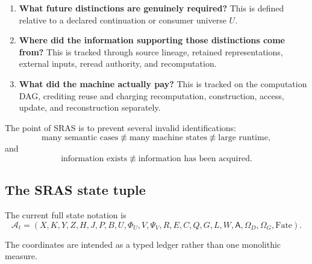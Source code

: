 \documentclass[11pt]{article}
\theoremstyle{plain}
\theoremstyle{definition}
\theoremstyle{remark}
\begin{document}
\begin{enumerate}[leftmargin=1.6em]
\item \textbf{What future distinctions are genuinely required?}
This is defined relative to a declared continuation or consumer universe $U$.

\item \textbf{Where did the information supporting those distinctions come from?}
This is tracked through source lineage, retained representations, external
inputs, reread authority, and recomputation.

\item \textbf{What did the machine actually pay?}
This is tracked on the computation DAG, crediting reuse and charging
recomputation, construction, access, update, and reconstruction separately.
\end{enumerate}

The point of SRAS is to prevent several invalid identifications:
\[
\text{many semantic cases}
\not\equiv
\text{many machine states}
\not\equiv
\text{large runtime},
\]
and
\[
\text{information exists}
\not\equiv
\text{information has been acquired}.
\]

\subsection{The SRAS state tuple}

The current full state notation is
\[
\mathcal A_t=
(X,K,Y,Z,H,J,P,B,U,\Phi_U,V,\Psi_V,R,E,C,Q,G,L,W,\mathsf A,
\Omega_D,\Omega_G,\mathrm{Fate}).
\]

The coordinates are intended as a typed ledger rather than one monolithic
measure.
\end{document}

